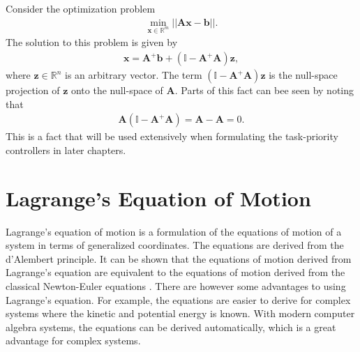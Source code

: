 Consider the optimization problem
\begin{align}
    \min_{\bm{x} \in \mathbb{R}^m} || \bm{A} \bm{x} - \bm{b} ||.
\end{align}
The solution to this problem is given by
\begin{align}
    \bm{x} = \bm{A}^{+} \bm{b} + (\mathbb{I} - \bm{A}^{+} \bm{A}) \bm{z},
\end{align}
where $\bm{z} \in \mathbb{R}^n$ is an arbitrary vector. The term $(\mathbb{I} - \bm{A}^{+} \bm{A}) \bm{z}$
is the null-space projection of $\bm{z}$ onto the null-space of $\bm{A}$. Parts
of this fact can bee seen by noting that
\begin{align}
    \bm{A}\left(\mathbb{I} - \bm{A}^{+} \bm{A}\right) = \bm{A} - \bm{A} = 0.
\end{align}
This is a fact that will be used extensively when formulating the task-priority
controllers in later chapters.

\section{Lagrange's Equation of Motion}
Lagrange's equation of motion is a formulation of the equations of motion of a
system in terms of generalized coordinates. The equations are derived from the
d'Alembert principle. It can be shown that the equations of motion derived from
Lagrange's equation are equivalent to the equations of motion derived from
the classical Newton-Euler equations \cite{modsim}. There are however some advantages to using
Lagrange's equation. For example, the equations are easier to derive for complex
systems where the kinetic and potential energy is known. With modern computer
algebra systems, the equations can be derived automatically, which is
a great advantage for complex systems.

